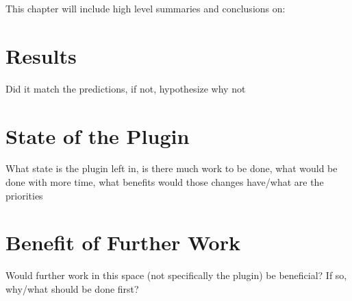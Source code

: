 This chapter will include high level summaries and conclusions on:

\section{Results}

Did it match the predictions, if not, hypothesize why not

\section{State of the Plugin}

What state is the plugin left in, is there much work to be done, what would be done with more time, what benefits would those changes have/what are the priorities

\section{Benefit of Further Work}

Would further work in this space (not specifically the plugin) be beneficial? If so, why/what should be done first?
